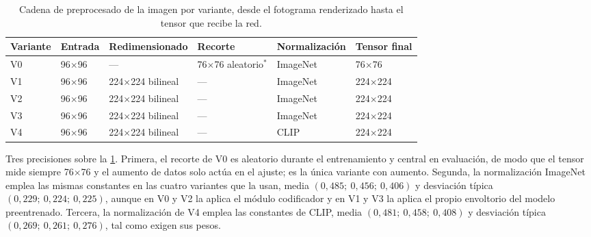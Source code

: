 \begin{table}[htbp]
  \centering
  \caption{Cadena de preprocesado de la imagen por variante, desde el fotograma
           renderizado hasta el tensor que recibe la red.}
  \label{tab:preprocesado}
  \small
  \begin{tabular}{llllll}
    \toprule
    Variante & Entrada & Redimensionado & Recorte & Normalizaci\'on & Tensor final \\
    \midrule
    V0 & \num{96}$\times$\num{96} & --- & \num{76}$\times$\num{76} aleatorio$^{*}$
       & ImageNet & \num{76}$\times$\num{76} \\
    V1 & \num{96}$\times$\num{96} & \num{224}$\times$\num{224} bilineal & ---
       & ImageNet & \num{224}$\times$\num{224} \\
    V2 & \num{96}$\times$\num{96} & \num{224}$\times$\num{224} bilineal & ---
       & ImageNet & \num{224}$\times$\num{224} \\
    V3 & \num{96}$\times$\num{96} & \num{224}$\times$\num{224} bilineal & ---
       & ImageNet & \num{224}$\times$\num{224} \\
    V4 & \num{96}$\times$\num{96} & \num{224}$\times$\num{224} bilineal & ---
       & CLIP & \num{224}$\times$\num{224} \\
    \bottomrule
  \end{tabular}
\end{table}

Tres precisiones sobre la \cref{tab:preprocesado}. Primera, el recorte de V0 es aleatorio
durante el entrenamiento y central en evaluaci\'on, de modo que el tensor mide siempre
\num{76}$\times$\num{76} y el aumento de datos solo act\'ua en el ajuste; es la \'unica
variante con aumento. Segunda, la normalizaci\'on ImageNet emplea las mismas constantes en
las cuatro variantes que la usan, media $(0{,}485;\ 0{,}456;\ 0{,}406)$ y desviaci\'on
t\'ipica $(0{,}229;\ 0{,}224;\ 0{,}225)$, aunque en V0 y V2 la aplica el m\'odulo
codificador y en V1 y V3 la aplica el propio envoltorio del modelo preentrenado. Tercera,
la normalizaci\'on de V4 emplea las constantes de CLIP, media $(0{,}481;\ 0{,}458;\
0{,}408)$ y desviaci\'on t\'ipica $(0{,}269;\ 0{,}261;\ 0{,}276)$, tal como exigen sus
pesos.


